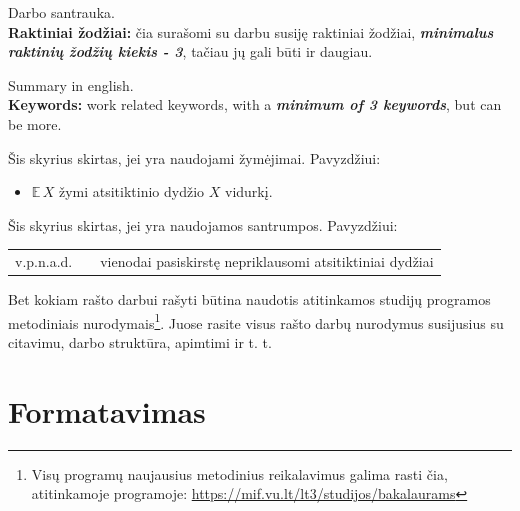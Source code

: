 \documentclass[]{VUMIFTemplateClass}
\newcommand{\EE}{\mathbb{E}\,}
\begin{document}

\onehalfspacing



Darbo santrauka.\\

\textbf{Raktiniai žodžiai:} čia surašomi su darbu susiję raktiniai žodžiai, \textit{\textbf{minimalus raktinių žodžių kiekis - 3}}, tačiau jų gali būti ir daugiau.



Summary in english.\\

\textbf{Keywords:} work related keywords, with a \textit{\textbf{minimum of 3 keywords}}, but can be more.


\singlespacing

\listoffigures 

\listoftables

\tableofcontents
\onehalfspacing


Šis skyrius skirtas, jei yra naudojami žymėjimai. Pavyzdžiui:    
\begin{itemize}
    \item $\EE X$ žymi atsitiktinio dydžio $X$ vidurkį.
\end{itemize}

Šis skyrius skirtas, jei yra naudojamos santrumpos. Pavyzdžiui:

\begin{tabular}{rcp{}}
    {v.p.n.a.d.} & {} & {vienodai pasiskirstę nepriklausomi atsitiktiniai dydžiai}
\end{tabular}

Bet kokiam rašto darbui rašyti būtina naudotis atitinkamos studijų programos metodiniais nurodymais\footnote{Visų programų naujausius metodinius reikalavimus galima rasti čia, atitinkamoje programoje: \url{https://mif.vu.lt/lt3/studijos/bakalaurams}}. Juose rasite visus rašto darbų nurodymus susijusius su citavimu, darbo struktūra, apimtimi ir t. t.


\section{Formatavimas}
\end{document}
